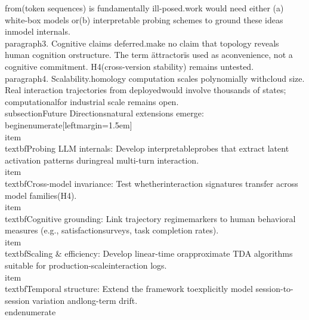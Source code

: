 \documentclass[11pt]{article}
\begin{document}
from\nobservables (token sequences) is fundamentally ill-posed.\nFuture work would need either (a) white-box models or\n(b) interpretable probing schemes to ground these ideas in\nreal model internals.\n\n\\paragraph{3. Cognitive claims deferred.}\nWe make no claim that topology reveals human cognition or\nneural structure. The term \"attractor\" is used as a\nmathematical convenience, not a cognitive commitment. H4\n(cross-version stability) remains untested.\n\n\\paragraph{4. Scalability.}\nPersistent homology computation scales polynomially with\npoint cloud size. Real interaction trajectories from deployed\nLLMs would involve thousands of states; computational\nfeasibility for industrial scale remains open.\n\n\\subsection{Future Directions}\n\nSeveral natural extensions emerge:\n\\begin{enumerate}[leftmargin=1.5em]\n  \\item \\textbf{Probing LLM internals}: Develop interpretable\n        probes that extract latent activation patterns during\n        real multi-turn interaction.\n  \\item \\textbf{Cross-model invariance}: Test whether\n        interaction signatures transfer across model families\n        (H4).\n  \\item \\textbf{Cognitive grounding}: Link trajectory regime\n        markers to human behavioral measures (e.g., satisfaction\n        surveys, task completion rates).\n  \\item \\textbf{Scaling & efficiency}: Develop linear-time or\n        approximate TDA algorithms suitable for production-scale\n        interaction logs.\n  \\item \\textbf{Temporal structure}: Extend the framework to\n        explicitly model session-to-session variation and\n        long-term drift.\n\\end{enumerate}\n\n%
\end{document}
